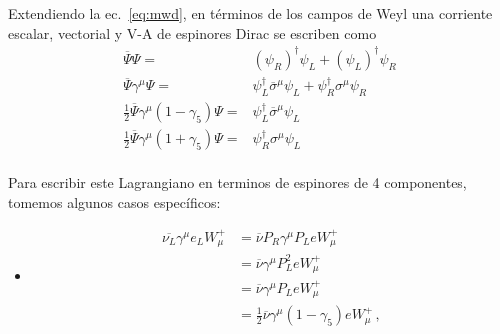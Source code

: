 \begin{frame}
Extendiendo la ec.~\eqref{eq:mwd}, en términos de los campos de Weyl una corriente escalar,  vectorial y V-A de espinores Dirac se escriben como
\begin{align}
\label{eq:8}
  \overline{\Psi}\Psi =& \left( \psi_R \right)^\dagger \psi_L+\left( \psi_L \right)^{\dagger}\psi_R \nonumber\\
  \overline{\Psi}\gamma^{\mu}\Psi=& \psi_L^{\dagger}\overline{\sigma}^{\mu}\psi_L+\psi_R^{\dagger}\sigma^{\mu}\psi_{R}\nonumber\\
  \tfrac{1}{2}\overline{\Psi}\gamma^{\mu}(1-\gamma_5)\Psi=& \psi_L^{\dagger}\overline{\sigma}^{\mu}\psi_L\nonumber\\
  \tfrac{1}{2}\overline{\Psi}\gamma^{\mu}(1+\gamma_5)\Psi=& \psi_R^{\dagger}{\sigma}^{\mu}\psi_L\nonumber\\
\end{align}

Para escribir este Lagrangiano en terminos de espinores de 4 componentes, tomemos algunos casos específicos:
\begin{itemize}
\item 
\begin{align}
\label{eq:wf4}
  \overline{\nu_L}\gamma^\mu e_LW_\mu^+&=\overline{\nu}P_R\gamma^\mu P_LeW_\mu^+\nonumber\\
&=\overline{\nu}\gamma^\mu P_L^2eW_\mu^+\nonumber\\
&=\overline{\nu}\gamma^\mu P_LeW_\mu^+\nonumber\\
&=\frac{1}{2}\overline{\nu}\gamma^\mu(1-\gamma_5)eW_\mu^+\,,
\end{align}


\end{itemize}
\end{frame}

